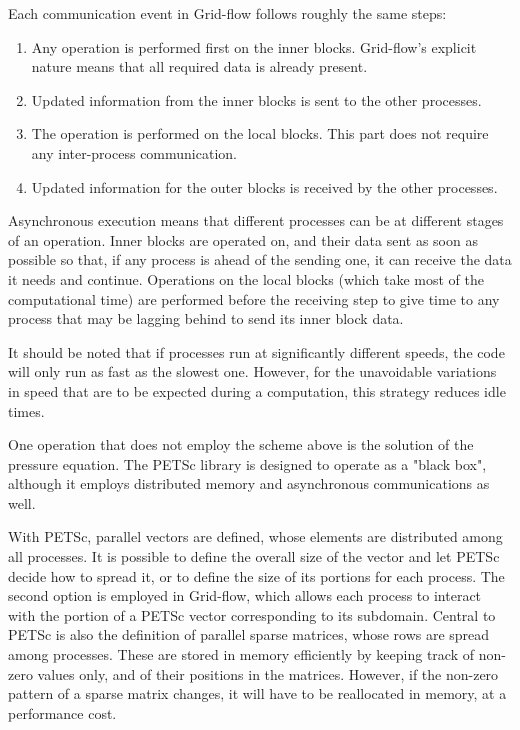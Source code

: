 \documentclass[11pt, a4paper, oneside, openany]{book}
\begin{document}
Each communication event in Grid-flow follows roughly the same steps:
\begin{enumerate}
	\item Any operation is performed first on the inner blocks. Grid-flow's explicit nature means that all required data is already present.
	\item Updated information from the inner blocks is sent to the other processes.
	\item The operation is performed on the local blocks. This part does not require any inter-process communication.
	\item Updated information for the outer blocks is received by the other processes. 
\end{enumerate}
Asynchronous execution means that different processes can be at different stages of an operation. Inner blocks are operated on, and their data sent as soon as possible so that, if any process is ahead of the sending one, it can receive the data it needs and continue. Operations on the local blocks (which take most of the computational time) are performed before the receiving step to give time to any process that may be lagging behind to send its inner block data.\par
It should be noted that if processes run at significantly different speeds, the code will only run as fast as the slowest one. However, for the unavoidable variations in speed that are to be expected during a computation, this strategy reduces idle times.\par
One operation that does not employ the scheme above is the solution of the pressure equation. The PETSc library is designed to operate as a "black box", although it employs distributed memory and asynchronous communications as well.\par
With PETSc, parallel vectors are defined, whose elements are distributed among all processes. It is possible to define the overall size of the vector and let PETSc decide how to spread it, or to define the size of its portions for each process. The second option is employed in Grid-flow, which allows each process to interact with the portion of a PETSc vector corresponding to its subdomain. 
Central to PETSc is also the definition of parallel sparse matrices, whose rows are spread among processes. These are stored in memory efficiently by keeping track of non-zero values only, and of their positions in the matrices. However, if the non-zero pattern of a sparse matrix changes, it will have to be reallocated in memory, at a performance cost. 
\end{document}
